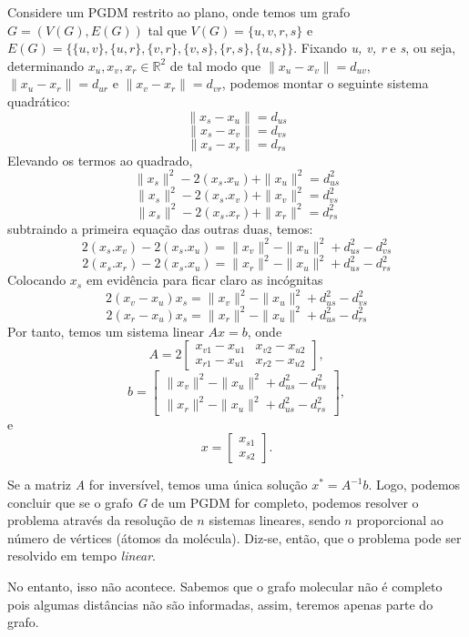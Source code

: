 \documentclass[a4paper,12pt]{article}
\begin{document}
	Considere um PGDM restrito ao plano, onde temos um grafo $G = (V(G), E(G))$ tal que $V(G)=\{u, v, r, s\}$ e $E(G)=\{\{u,v\}, \{u, r\}, \{v, r\}, \{v, s\}, \{r, s\}, \{u, s\}\}$. Fixando \textit{u, v, r} e \textit{s}, ou seja, determinando $ x_{u}, x_{v},x_{r} \in\mathbb{R}^2$ de tal modo que $\|x_{u} - x_{v}\|= d_{uv}$,  $\|x_{u} - x_{r}\|= d_{ur}$ e $\|x_{v} - x_{r}\|= d_{vr}$, podemos montar o  seguinte sistema quadrático:
	$$ \|x_{s} - x_{u}\|= d_{us} $$$$ \|x_{s} - x_{v}\|= d_{vs} $$$$ \|x_{s} - x_{r}\|= d_{rs} $$
	Elevando os termos ao quadrado,
	$$\|x_{s}\|^{2} - 2(x_{s}.x_{u}) + \|x_{u}\|^{2} = d_{us}^{2}$$
	$$\|x_{s}\|^{2} - 2(x_{s}.x_{v}) + \|x_{v}\|^{2} = d_{vs}^{2}$$
	$$\|x_{s}\|^{2} - 2(x_{s}.x_{r}) + \|x_{r}\|^{2} = d_{rs}^{2}$$
	subtraindo a primeira equação das outras duas, temos:
	$$2(x_{s}.x_{v}) - 2(x_{s}.x_{u}) = \|x_{v}\|^{2} - \|x_{u}\|^{2} + d_{us}^{2} - d_{vs}^{2}$$
	$$2(x_{s}.x_{r}) - 2(x_{s}.x_{u}) = \|x_{r}\|^{2} - \|x_{u}\|^{2} + d_{us}^{2} - d_{rs}^{2}$$
	Colocando $x_{s}$ em evidência para ficar claro as incógnitas
	$$2(x_{v} - x_{u})x_{s} = \|x_{v}\|^{2} - \|x_{u}\|^{2} + d_{us}^{2} - d_{vs}^{2}$$
	$$2(x_{r} - x_{u})x_{s} = \|x_{r}\|^{2} - \|x_{u}\|^{2} + d_{us}^{2} - d_{rs}^{2}$$
	Por tanto, temos um sistema linear $Ax = b$, onde
	$$
	A = 2\begin{bmatrix}
	x_{v1} - x_{u1} & x_{v2} - x_{u2}\\
	x_{r1} - x_{u1} & x_{r2} - x_{u2}
	\end{bmatrix},
	$$
	$$
	b = \begin{bmatrix}
	\|x_{v}\|^{2} - \|x_{u}\|^{2} + d_{us}^{2} - d_{vs}^{2}\\
	\|x_{r}\|^{2} - \|x_{u}\|^{2} + d_{us}^{2} - d_{rs}^{2}
	\end{bmatrix},
	$$
	e
	$$
	x = \begin{bmatrix}
	x_{s1}\\
	x_{s2}
	\end{bmatrix}.
	$$
	
	Se a matriz \textit{A} for inversível, temos uma única solução $x^{*} = A^{-1}b$. Logo, podemos concluir que se o grafo \textit{G} de um PGDM for completo, podemos resolver o problema através da resolução de $n$ sistemas lineares, sendo $n$ proporcional ao número de vértices (átomos da molécula). Diz-se, então, que o problema pode ser resolvido em tempo \textit{linear}.
	
	No entanto, isso não acontece. Sabemos que o grafo molecular não é completo pois algumas distâncias não são informadas, assim, teremos apenas parte do grafo. 
	
\end{document}
